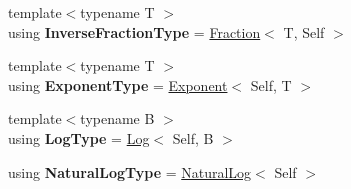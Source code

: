\begin{DoxyCompactItemize}
\item 
\hypertarget{classlatex_1_1math_1_1Arithmetic_a2930ddb8252ec1f4bdc424ac1257e85f}{{\footnotesize template$<$typename T $>$ }\\using {\bfseries Inverse\-Fraction\-Type} = \hyperlink{classlatex_1_1math_1_1Fraction}{Fraction}$<$ T, Self $>$}\label{classlatex_1_1math_1_1Arithmetic_a2930ddb8252ec1f4bdc424ac1257e85f}

\item 
\hypertarget{classlatex_1_1math_1_1Arithmetic_a71daf5ab720de2222a40ea2539b6e24e}{{\footnotesize template$<$typename T $>$ }\\using {\bfseries Exponent\-Type} = \hyperlink{classlatex_1_1math_1_1Exponent}{Exponent}$<$ Self, T $>$}\label{classlatex_1_1math_1_1Arithmetic_a71daf5ab720de2222a40ea2539b6e24e}

\item 
\hypertarget{classlatex_1_1math_1_1Arithmetic_a4eadf0c90fdc049d2cae9666486fcbea}{{\footnotesize template$<$typename B $>$ }\\using {\bfseries Log\-Type} = \hyperlink{classlatex_1_1math_1_1Log}{Log}$<$ Self, B $>$}\label{classlatex_1_1math_1_1Arithmetic_a4eadf0c90fdc049d2cae9666486fcbea}

\item 
\hypertarget{classlatex_1_1math_1_1Arithmetic_a9915f8e5e4a9f6019e4d7e307bd52b27}{using {\bfseries Natural\-Log\-Type} = \hyperlink{classlatex_1_1math_1_1NaturalLog}{Natural\-Log}$<$ Self $>$}\label{classlatex_1_1math_1_1Arithmetic_a9915f8e5e4a9f6019e4d7e307bd52b27}

\end{DoxyCompactItemize}
